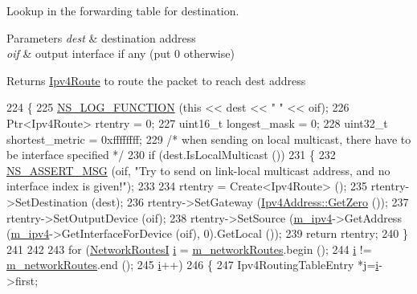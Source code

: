 Lookup in the forwarding table for destination. 


\begin{DoxyParams}{Parameters}
{\em dest} & destination address \\
\hline
{\em oif} & output interface if any (put 0 otherwise) \\
\hline
\end{DoxyParams}
\begin{DoxyReturn}{Returns}
\hyperlink{classns3_1_1Ipv4Route}{Ipv4\+Route} to route the packet to reach dest address 
\end{DoxyReturn}

\begin{DoxyCode}
224 \{
225   \hyperlink{log-macros-disabled_8h_a90b90d5bad1f39cb1b64923ea94c0761}{NS\_LOG\_FUNCTION} (\textcolor{keyword}{this} << dest << \textcolor{stringliteral}{" "} << oif);
226   Ptr<Ipv4Route> rtentry = 0;
227   uint16\_t longest\_mask = 0;
228   uint32\_t shortest\_metric = 0xffffffff;
229   \textcolor{comment}{/* when sending on local multicast, there have to be interface specified */}
230   \textcolor{keywordflow}{if} (dest.IsLocalMulticast ())
231     \{
232       \hyperlink{assert_8h_aff5ece9066c74e681e74999856f08539}{NS\_ASSERT\_MSG} (oif, \textcolor{stringliteral}{"Try to send on link-local multicast address, and no interface index
       is given!"});
233 
234       rtentry = Create<Ipv4Route> ();
235       rtentry->SetDestination (dest);
236       rtentry->SetGateway (\hyperlink{classns3_1_1Ipv4Address_aeeb1c76b35d4ab612fda7bc51e99c5db}{Ipv4Address::GetZero} ());
237       rtentry->SetOutputDevice (oif);
238       rtentry->SetSource (\hyperlink{classns3_1_1Ipv4StaticRouting_adc30356be1824ea40ffbd444a5d91b9f}{m\_ipv4}->GetAddress (\hyperlink{classns3_1_1Ipv4StaticRouting_adc30356be1824ea40ffbd444a5d91b9f}{m\_ipv4}->GetInterfaceForDevice (oif), 0).GetLocal 
      ());
239       \textcolor{keywordflow}{return} rtentry;
240     \}
241 
242 
243   \textcolor{keywordflow}{for} (\hyperlink{classns3_1_1Ipv4StaticRouting_a3d4f303cbea2117f36f3dd2da3ac59c9}{NetworkRoutesI} \hyperlink{bernuolliDistribution_8m_a6f6ccfcf58b31cb6412107d9d5281426}{i} = \hyperlink{classns3_1_1Ipv4StaticRouting_a81e0b111629b14fff2efbf69180a64c1}{m\_networkRoutes}.begin (); 
244        \hyperlink{bernuolliDistribution_8m_a6f6ccfcf58b31cb6412107d9d5281426}{i} != \hyperlink{classns3_1_1Ipv4StaticRouting_a81e0b111629b14fff2efbf69180a64c1}{m\_networkRoutes}.end (); 
245        \hyperlink{bernuolliDistribution_8m_a6f6ccfcf58b31cb6412107d9d5281426}{i}++) 
246     \{
247       Ipv4RoutingTableEntry *j=\hyperlink{bernuolliDistribution_8m_a6f6ccfcf58b31cb6412107d9d5281426}{i}->first;

\end{DoxyCode}
